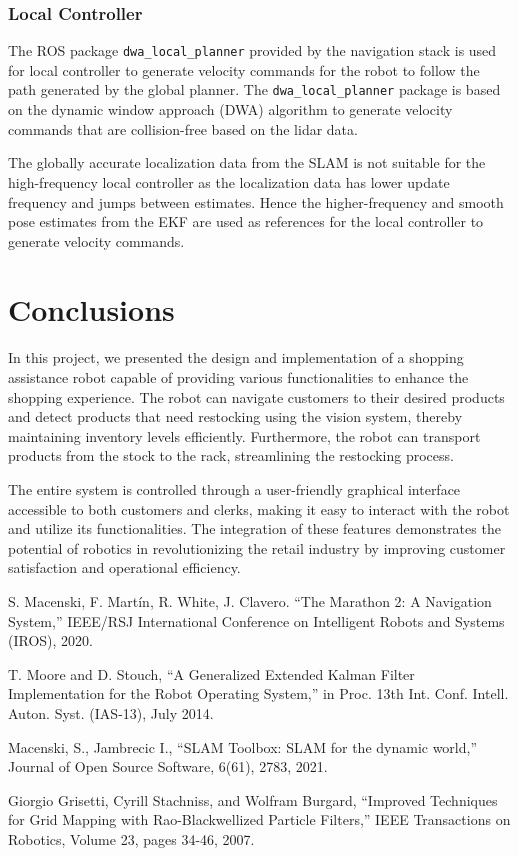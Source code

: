 \documentclass[conference]{IEEEtran}
\begin{document}
\subsubsection{Local Controller}

The ROS package \verb|dwa_local_planner| provided by the navigation stack is used for local controller to generate velocity commands for the robot to follow the path generated by the global planner. The \verb|dwa_local_planner| package is based on the dynamic window approach (DWA) algorithm to generate velocity commands that are collision-free based on the lidar data.

The globally accurate localization data from the SLAM is not suitable for the high-frequency local controller as the localization data has lower update frequency and jumps between estimates. Hence the higher-frequency and smooth pose estimates from the EKF are used as references for the local controller to generate velocity commands.

\section{Conclusions}

In this project, we presented the design and implementation of a shopping assistance robot capable of providing various functionalities to enhance the shopping experience. The robot can navigate customers to their desired products and detect products that need restocking using the vision system, thereby maintaining inventory levels efficiently. Furthermore, the robot can transport products from the stock to the rack, streamlining the restocking process.

The entire system is controlled through a user-friendly graphical interface accessible to both customers and clerks, making it easy to interact with the robot and utilize its functionalities. The integration of these features demonstrates the potential of robotics in revolutionizing the retail industry by improving customer satisfaction and operational efficiency.

\begin{thebibliography}{00}

     S. Macenski, F. Martín, R. White, J. Clavero. ``The Marathon 2: A Navigation System,'' IEEE/RSJ International Conference on Intelligent Robots and Systems (IROS), 2020.

     T. Moore and D. Stouch, ``A Generalized Extended Kalman Filter Implementation for the Robot Operating System,'' in Proc. 13th Int. Conf. Intell. Auton. Syst. (IAS-13), July 2014.

     Macenski, S., Jambrecic I., ``SLAM Toolbox: SLAM for the dynamic world,'' Journal of Open Source Software, 6(61), 2783, 2021.

     Giorgio Grisetti, Cyrill Stachniss, and Wolfram Burgard, ``Improved Techniques for Grid Mapping with Rao-Blackwellized Particle Filters,'' IEEE Transactions on Robotics, Volume 23, pages 34-46, 2007.

\end{thebibliography}
\end{document}
